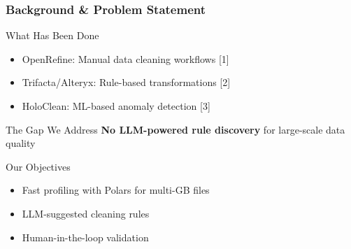 \documentclass{beamer}
\begin{document}
\begin{frame}
    \frametitle{Background \& Problem Statement}
    
    \begin{block}{What Has Been Done}
        \begin{itemize}
            \item OpenRefine: Manual data cleaning workflows [1]
            \item Trifacta/Alteryx: Rule-based transformations [2]
            \item HoloClean: ML-based anomaly detection [3]
        \end{itemize}
    \end{block}
    
    \vspace{0.15cm}
    
    \begin{alertblock}{The Gap We Address}
        \textbf{No LLM-powered rule discovery} for large-scale data quality
    \end{alertblock}
    
    \vspace{0.15cm}
    
    \begin{exampleblock}{Our Objectives}
        \begin{itemize}
            \item Fast profiling with Polars for multi-GB files
            \item LLM-suggested cleaning rules
            \item Human-in-the-loop validation
        \end{itemize}
    \end{exampleblock}
\end{frame}
\end{document}
